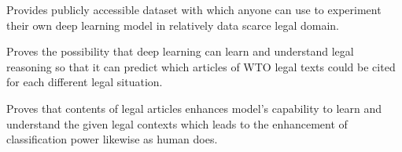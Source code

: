 \documentclass[sigconf]{acmart}
\begin{document}
\textbullet \hspace{1mm}  Provides publicly accessible dataset with which anyone can use to experiment their own deep learning model in relatively data scarce legal domain.\vspace{2mm}

\textbullet \hspace{1mm} Proves the possibility that deep learning can learn and understand legal reasoning so that it can predict which articles of WTO legal texts could be cited for each different legal situation.\vspace{2mm}

\textbullet \hspace{1mm} Proves that contents of legal articles enhances model's capability to learn and understand the given legal contexts which leads to the enhancement of classification power likewise as human does.
\end{document}
